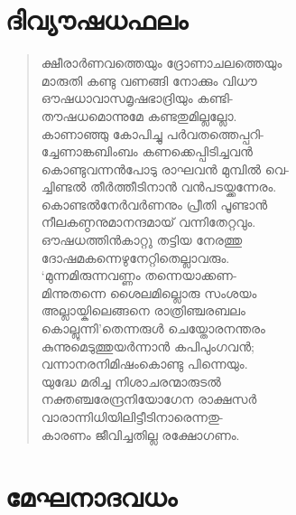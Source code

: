 
\section{ദിവ്യൗഷധഫലം}

\begin{verse}
ക്ഷീരാര്‍ണവത്തെയും ദ്രോണാചലത്തെയും\\
മാരുതി കണ്ടു വണങ്ങി നോക്കും വിധൗ\\
ഔഷധാവാസമൃഷഭാദ്രിയും കണ്ടി-\\
തൗഷധമൊന്നുമേ കണ്ടതുമില്ലല്ലോ.\\
കാണാഞ്ഞു കോപിച്ചു പര്‍വതത്തെപ്പറി-\\
ച്ചേണാങ്കബിംബം കണക്കെപ്പിടിച്ചവന്‍\\
കൊണ്ടുവന്നന്‍പോടു രാഘവന്‍ മുമ്പില്‍ വെ-\\
ച്ചിണ്ടല്‍ തീര്‍ത്തീടിനാന്‍ വന്‍പടയ്ക്കന്നേരം.\\
കൊണ്ടല്‍നേര്‍വര്‍ണനും പ്രീതി പൂണ്ടാന്‍\\
നീലകണ്ഠനുമാനന്ദമായ് വന്നിതേറ്റവും.\\
ഔഷധത്തിന്‍കാറ്റു തട്ടിയ നേരത്തു\\
ദോഷമകന്നെഴുനേറ്റിതെല്ലാവരും.\\
‘മുന്നമിരുന്നവണ്ണം തന്നെയാക്കണ-\\
മിന്നുതന്നെ ശൈലമില്ലൊരു സംശയം\\
അല്ലായ്കിലെങ്ങനെ രാത്രിഞ്ചരബലം\\
കൊല്ലുന്നി’തെന്നരുള്‍ ചെയ്തോരനന്തരം\\
കുന്നുമെടുത്തുയര്‍ന്നാന്‍ കപിപുംഗവന്‍;\\
വന്നാനരനിമിഷംകൊണ്ടു പിന്നെയും.\\
യുദ്ധേ മരിച്ച നിശാചരന്മാരുടല്‍\\
നക്തഞ്ചരേന്ദ്രനിയോഗേന രാക്ഷസര്‍\\
വാരാന്നിധിയിലിട്ടീടിനാരെന്നതു-\\
കാരണം ജീവിച്ചതില്ല രക്ഷോഗണം.
\end{verse}
\newpage


\section{മേഘനാദവധം}

